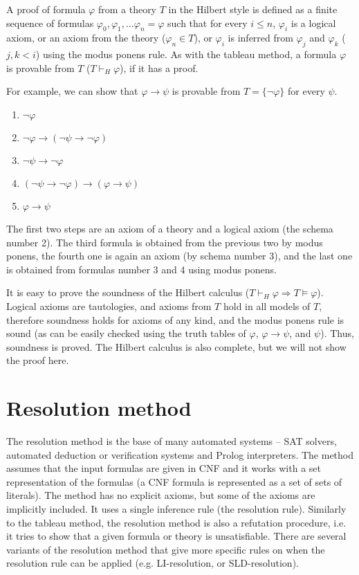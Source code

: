 A proof of formula $\varphi$ from a theory $T$ in the Hilbert style is defined as a finite sequence of formulas $\varphi_0, \varphi_1, \dots \varphi_n = \varphi$ such that for every $i \leq n$, $\varphi_i$ is a logical axiom, or an axiom from the theory ($\varphi_n \in T$), or $\varphi_i$ is inferred from $\varphi_j$ and $\varphi_k$ ($j,k < i$) using the modus ponens rule. As with the tableau method, a formula $\varphi$ is provable from $T$ ($T \vdash_H \varphi$), if it has a proof.

For example, we can show that $\varphi \to \psi$ is provable from $T = \{\neg \varphi\}$ for every $\psi$.

\begin{enumerate}
\item $\neg \varphi$
\item $\neg \varphi \to (\neg \psi \to \neg \varphi)$
\item $\neg \psi \to \neg \varphi$
\item $(\neg \psi \to \neg \varphi) \to (\varphi \to \psi)$
\item $\varphi \to \psi$
\end{enumerate}

The first two steps are an axiom of a theory and a logical axiom (the schema number 2). The third formula is obtained from the previous two by modus ponens, the fourth one is again an axiom (by schema number 3), and the last one is obtained from formulas number 3 and 4 using modus ponens.

It is easy to prove the soundness of the Hilbert calculus ($T \vdash_H \varphi \Rightarrow T \vDash \varphi$). Logical axioms are tautologies, and axioms from $T$ hold in all models of $T$, therefore soundness holds for axioms of any kind, and the modus ponens rule is sound (as can be easily checked using the truth tables of $\varphi$, $\varphi \to \psi$, and $\psi$). Thus, soundness is proved. The Hilbert calculus is also complete, but we will not show the proof here.

\section{Resolution method}

The resolution method is the base of many automated systems -- SAT solvers, automated deduction or verification systems and Prolog interpreters. The method assumes that the input formulas are given in CNF and it works with a set representation of the formulas (a CNF formula is represented as a set of sets of literals). The method has no explicit axioms, but some of the axioms are implicitly included. It uses a single inference rule (the resolution rule). Similarly to the tableau method, the resolution method is also a refutation procedure, i.e. it tries to show that a given formula or theory is unsatisfiable. There are several variants of the resolution method that give more specific rules on when the resolution rule can be applied (e.g. LI-resolution, or SLD-resolution).

